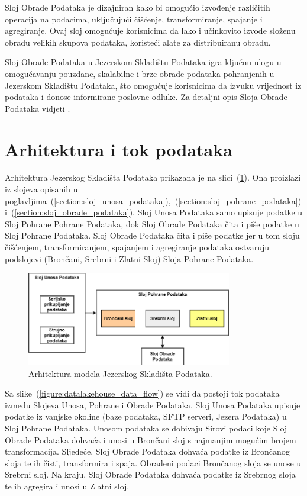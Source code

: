 Sloj Obrade Podataka je dizajniran kako bi omogućio izvođenje različitih
operacija na podacima, uključujući čišćenje, transformiranje, spajanje i
agregiranje. Ovaj sloj omogućuje korisnicima da lako i učinkovito izvode složenu
obradu velikih skupova podataka, koristeći alate za distribuiranu obradu.

Sloj Obrade Podataka u Jezerskom Skladištu Podataka igra ključnu ulogu u
omogućavanju pouzdane, skalabilne i brze obrade podataka pohranjenih u Jezerskom
Skladištu Podataka, što omogućuje korisnicima da izvuku vrijednost iz podataka i
donose informirane poslovne odluke. Za detaljni opis Sloja Obrade Podataka
vidjeti \cite{datalakehouse2022}.

\section{Arhitektura i tok podataka} \label{section:arhitektura_i_tok_podataka}

Arhitektura Jezerskog Skladišta Podataka prikazana je na
slici~(\ref{figure:datalakehouse_architecture}). Ona proizlazi iz slojeva opisanih
u
poglavljima~(\ref{section:sloj_unosa_podataka}),~(\ref{section:sloj_pohrane_podataka})
i~(\ref{section:sloj_obrade_podataka}). Sloj Unosa Podataka samo upisuje podatke
u Sloj Pohrane Pohrane Podataka, dok Sloj Obrade Podataka čita i piše podatke u
Sloj Pohrane Podataka. Sloj Obrade Podataka čita i piše podatke jer u tom sloju
čišćenjem, transformiranjem, spajanjem i agregiranje podataka ostvaruju
podslojevi (Brončani, Srebrni i Zlatni Sloj) Sloja Pohrane Podataka.

\begin{figure}[htb]
    \centering
    \includegraphics[width=0.8\textwidth]{images/arhitektura.drawio.png}
    \caption{Arhitektura modela Jezerskog Skladišta Podataka.}
    \label{figure:datalakehouse_architecture}
\end{figure}

Sa slike~(\ref{figure:datalakehouse_data_flow}) se vidi da postoji tok podataka
između Slojeva Unosa, Pohrane i Obrade Podataka. Sloj Unosa Podataka upisuje
podatke iz vanjske okoline (baze podataka, SFTP serveri, Jezera Podataka) u Sloj
Pohrane Podataka. Unosom podataka se dobivaju Sirovi podaci koje Sloj Obrade
Podataka dohvaća i unosi u Brončani sloj s najmanjim mogućim brojem
transformacija. Sljedeće, Sloj Obrade Podataka dohvaća podatke iz Brončanog
sloja te ih čisti, transformira i spaja. Obrađeni podaci Brončanog sloja se
unose u Srebrni sloj. Na kraju, Sloj Obrade Podataka dohvaća podatke iz Srebrnog
sloja te ih agregira i unosi u Zlatni sloj. 

